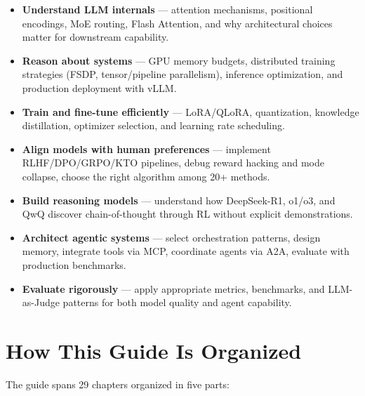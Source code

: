 \documentclass[11pt,a4paper,openany]{book}
\begin{document}
\begin{itemize}
  \item \textbf{Understand LLM internals} --- attention mechanisms, positional encodings, MoE routing, Flash Attention, and why architectural choices matter for downstream capability.
  \item \textbf{Reason about systems} --- GPU memory budgets, distributed training strategies (FSDP, tensor/pipeline parallelism), inference optimization, and production deployment with vLLM.
  \item \textbf{Train and fine-tune efficiently} --- LoRA/QLoRA, quantization, knowledge distillation, optimizer selection, and learning rate scheduling.
  \item \textbf{Align models with human preferences} --- implement RLHF/DPO/GRPO/KTO pipelines, debug reward hacking and mode collapse, choose the right algorithm among 20+ methods.
  \item \textbf{Build reasoning models} --- understand how DeepSeek-R1, o1/o3, and QwQ discover chain-of-thought through RL without explicit demonstrations.
  \item \textbf{Architect agentic systems} --- select orchestration patterns, design memory, integrate tools via MCP, coordinate agents via A2A, evaluate with production benchmarks.
  \item \textbf{Evaluate rigorously} --- apply appropriate metrics, benchmarks, and LLM-as-Judge patterns for both model quality and agent capability.
\end{itemize}

\section*{How This Guide Is Organized}
\label{how-this-guide-is-organized}

The guide spans 29 chapters organized in five parts:
\end{document}
